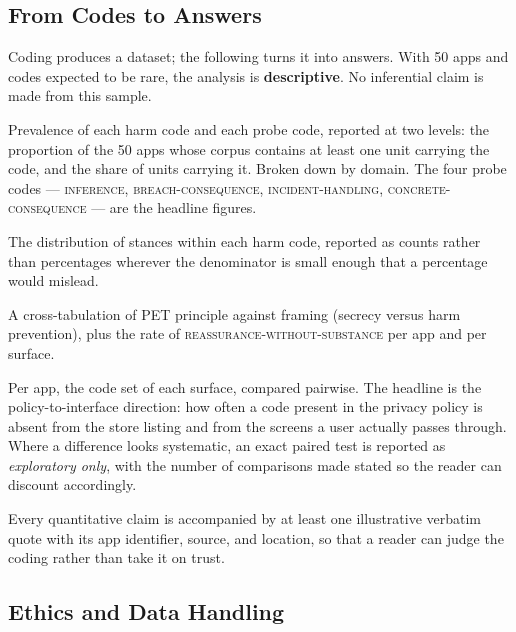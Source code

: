 \subsection{From Codes to Answers}
\label{sec:analysis}

Coding produces a dataset; the following turns it into answers. With 50 apps and
codes expected to be rare, the analysis is \textbf{descriptive}. No inferential
claim is made from this sample.

\begin{description}[leftmargin=1.5cm,style=nextline,itemsep=3pt]
  \item[\textbf{RQ1}] Prevalence of each harm code and each probe code, reported
    at two levels: the proportion of the 50 apps whose corpus contains at least
    one unit carrying the code, and the share of units carrying it. Broken down
    by domain. The four probe codes --- \textsc{inference},
    \textsc{breach-consequence}, \textsc{incident-handling},
    \textsc{concrete-consequence} --- are the headline figures.
  \item[\textbf{RQ2}] The distribution of stances within each harm code,
    reported as counts rather than percentages wherever the denominator is small
    enough that a percentage would mislead.
  \item[\textbf{RQ3}] A cross-tabulation of PET principle against framing
    (secrecy versus harm prevention), plus the rate of
    \textsc{reassurance-without-substance} per app and per surface.
  \item[\textbf{RQ4}] Per app, the code set of each surface, compared pairwise.
    The headline is the policy-to-interface direction: how often a code present
    in the privacy policy is absent from the store listing and from the screens
    a user actually passes through. Where a difference looks systematic, an
    exact paired test is reported as \emph{exploratory only}, with the number of
    comparisons made stated so the reader can discount accordingly.
\end{description}

Every quantitative claim is accompanied by at least one illustrative verbatim
quote with its app identifier, source, and location, so that a reader can judge
the coding rather than take it on trust.

\subsection{Ethics and Data Handling}
\label{sec:ethics}

